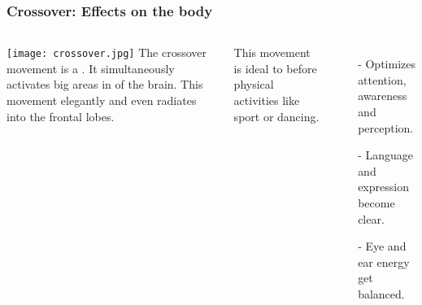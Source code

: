\begin{frame}
\frametitle{Crossover: Effects on the body}

\begin{columns}[c] %
\texttt{[image: crossover.jpg]}
The crossover movement is a . It simultaneously activates big areas in  of the brain. This movement elegantly  and even radiates into the frontal lobes. 

This movement is ideal to  before physical activities like sport or dancing.
	\begin{itemize}
	\item[-] Optimizes attention, awareness and perception.
	\item[-] Language and expression become clear.
	\item[-] Eye and ear energy get balanced.
	\end{itemize}
	

\end{columns}
\end{frame}
